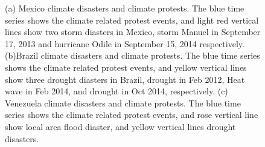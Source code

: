 \documentclass[9pt,twocolumn,twoside]{pnas-new}
\begin{document}
%


\begin{figure}[ht]
	\centering
	\caption{(a) Mexico climate disasters and climate protests. The blue time series shows the climate related protest events, and light red vertical lines show two storm diasters in Mexico, storm Manuel in September 17, 2013 and hurricane Odile in September 15, 2014 respectively. (b)Brazil climate disasters and climate protests. The blue time series shows the climate related protest events, and yellow vertical lines show three drought diasters in Brazil, drought in Feb 2012, Heat wave in Feb 2014, and drought in Oct 2014, respectively. (c) Venezuela climate disasters and climate protests. The blue time series shows the climate related protest events, and rose vertical line show local area flood diaster, and yellow vertical lines drought disasters.}
\label{climate-timeseries}
\end{figure}
\end{document}
